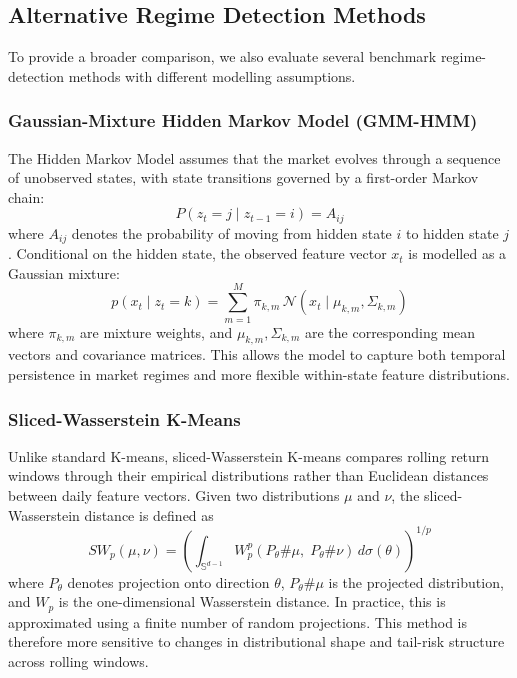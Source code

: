 \documentclass[11pt, a4paper]{article}
\begin{document}
\subsection{Alternative Regime Detection Methods}

To provide a broader comparison, we also evaluate several benchmark regime-detection methods with different modelling assumptions.

\subsubsection{Gaussian-Mixture Hidden Markov Model (GMM-HMM)}
The Hidden Markov Model assumes that the market evolves through a sequence of unobserved states, with state transitions governed by a first-order Markov chain:
\begin{equation}
\label{eq:hmm_transition}
P(z_t = j \mid z_{t-1} = i) = A_{ij}
\end{equation}
where $A_{ij}$ denotes the probability of moving from hidden state $i$ to hidden state $j$. Conditional on the hidden state, the observed feature vector $x_t$ is modelled as a Gaussian mixture:
\begin{equation}
\label{eq:gmmhmm}
p(x_t \mid z_t = k) = \sum_{m=1}^{M} \pi_{k,m} \, \mathcal{N}(x_t \mid \mu_{k,m}, \Sigma_{k,m})
\end{equation}
where $\pi_{k,m}$ are mixture weights, and $\mu_{k,m}, \Sigma_{k,m}$ are the corresponding mean vectors and covariance matrices. This allows the model to capture both temporal persistence in market regimes and more flexible within-state feature distributions.

\subsubsection{Sliced-Wasserstein K-Means}
Unlike standard K-means, sliced-Wasserstein K-means compares rolling return windows through their empirical distributions rather than Euclidean distances between daily feature vectors. Given two distributions $\mu$ and $\nu$, the sliced-Wasserstein distance is defined as
\begin{equation}
SW_p(\mu,\nu)
=
\left(
\int_{\mathbb{S}^{d-1}}
W_p^p(P_\theta\#\mu,\;P_\theta\#\nu)\, d\sigma(\theta)
\right)^{1/p}
\end{equation}
where $P_\theta$ denotes projection onto direction $\theta$, $P_\theta \# \mu$ is the projected distribution, and $W_p$ is the one-dimensional Wasserstein distance. In practice, this is approximated using a finite number of random projections. This method is therefore more sensitive to changes in distributional shape and tail-risk structure across rolling windows.
\end{document}
